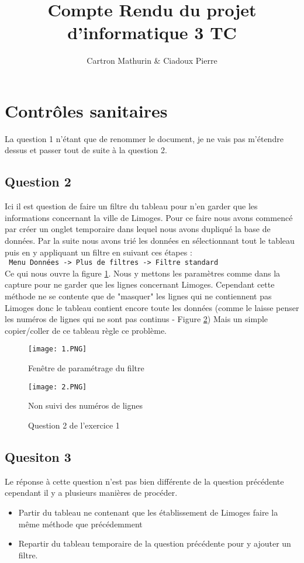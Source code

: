 \documentclass[10pt,a4paper]{article}
\author{Cartron Mathurin \& Ciadoux Pierre}
\title{Compte Rendu du projet d'informatique 3 TC}
\begin{document}
\maketitle
\tableofcontents
\newpage

\section{Contrôles sanitaires}
La question 1 n'étant que de renommer le document, je ne vais pas m'étendre dessus et passer tout de suite à la question 2. 
\subsection{Question 2}
Ici il est question de faire un filtre du tableau pour n'en garder que les informations concernant la ville de Limoges. Pour ce faire nous avons commencé par créer un onglet temporaire dans lequel nous avons dupliqué la base de données. Par la suite nous avons trié les données en sélectionnant tout le tableau puis en y appliquant un filtre en suivant ces étapes : \\
\verb| Menu Données -> Plus de filtres -> Filtre standard| \\
Ce qui nous ouvre la figure \ref{fig1}. Nous y mettons les paramètres comme dans la capture pour ne garder que les lignes concernant Limoges. Cependant cette méthode ne se contente que de "masquer" les lignes qui ne contiennent pas Limoges donc le tableau contient encore toute les données (comme le laisse penser les numéros de lignes qui ne sont pas continus - Figure \ref{fig2}) Mais un simple copier/coller de ce tableau règle ce problème. 
\begin{figure}[!h]
  \centering
   \texttt{[image: 1.PNG]}
  \caption{Fenêtre de paramétrage du filtre}
  \label{fig1}
\end{figure}
\begin{figure}[!h]
  \centering
  \texttt{[image: 2.PNG]}
  \caption{Non suivi des numéros de lignes}
  \label{fig2}
\caption{Question 2 de l'exercice 1}
\end{figure}

\subsection{Quesiton 3}
Le réponse à cette question n'est pas bien différente de la question précédente cependant il y a plusieurs manières de procéder. 
\begin{itemize}
\item Partir du tableau ne contenant que les établissement de Limoges faire la même méthode que précédemment
\item Repartir du tableau temporaire de la question précédente pour y ajouter un filtre. 
\end{itemize}
\end{document}
